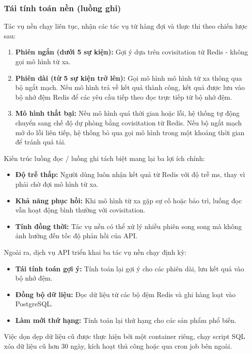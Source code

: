 \documentclass[../BTL.tex]{subfiles}
\begin{document}
\subsubsection{Tái tính toán nền (luồng ghi)}
Tác vụ nền chạy liên tục, nhận các tác vụ từ hàng đợi và thực thi theo chiến lược sau:

\begin{enumerate}
    \item \textbf{Phiên ngắn (dưới 5 sự kiện):} Gợi ý dựa trên covisitation từ Redis - không gọi mô hình từ xa.
    \item \textbf{Phiên dài (từ 5 sự kiện trở lên):} Gọi mô hình mô hình từ xa thông qua bộ ngắt mạch. Nếu mô hình trả về kết quả thành công, kết quả được lưu vào bộ nhớ đệm Redis để các yêu cầu tiếp theo đọc trực tiếp từ bộ nhớ đệm.
    \item \textbf{Mô hình thất bại:} Nếu mô hình quá thời gian hoặc lỗi, hệ thống tự động chuyển sang chế độ dự phòng bằng covisitation từ Redis. Nếu bộ ngắt mạch mở do lỗi liên tiếp, hệ thống bỏ qua gọi mô hình trong một khoảng thời gian để tránh quá tải.
\end{enumerate}

Kiến trúc luồng đọc / luồng ghi tách biệt mang lại ba lợi ích chính:
\begin{itemize}
    \item \textbf{Độ trễ thấp:} Người dùng luôn nhận kết quả từ Redis với độ trễ ms, thay vì phải chờ đợi mô hình từ xa.
    \item \textbf{Khả năng phục hồi:} Khi mô hình từ xa gặp sự cố hoặc bảo trì, luồng đọc vẫn hoạt động bình thường với covisitation.
    \item \textbf{Tính đồng thời:} Tác vụ nền có thể xử lý nhiều phiên song song mà không ảnh hưởng đến tốc độ phản hồi của API.
\end{itemize}

Ngoài ra, dịch vụ API triển khai ba tác vụ nền chạy định kỳ:
\begin{itemize}
    \item \textbf{Tái tính toán gợi ý:} Tính toán lại gợi ý cho các phiên dài, lưu kết quả vào bộ nhớ đệm.
    \item \textbf{Đồng bộ dữ liệu:} Đọc dữ liệu từ các bộ đệm Redis và ghi hàng loạt vào PostgreSQL.
    \item \textbf{Làm mới thứ hạng:} Tính toán lại thứ hạng cho các sản phẩm phổ biến.
\end{itemize}
Việc dọn dẹp dữ liệu cũ được thực hiện bởi một container riêng, chạy script SQL xóa dữ liệu cũ hơn 30 ngày, kích hoạt thủ công hoặc qua cron job bên ngoài.
\end{document}

